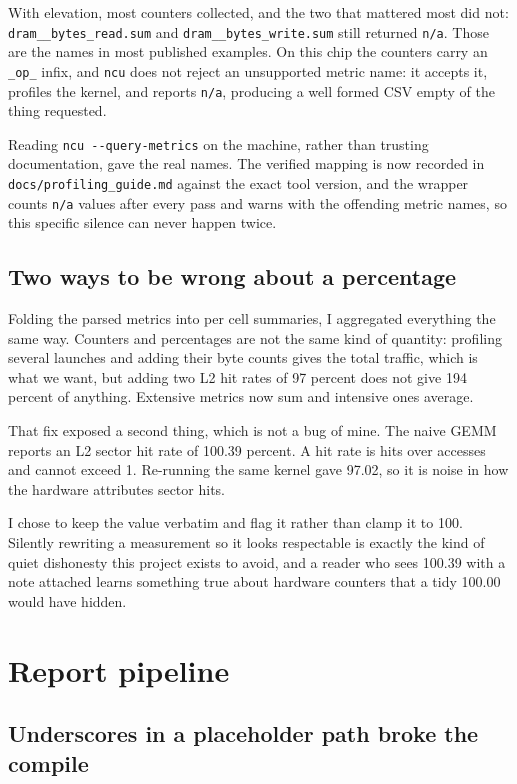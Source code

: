 ﻿\documentclass[11pt]{article}
\begin{document}
With elevation, most counters collected, and the two that mattered most did not:
\texttt{dram\_\_bytes\_\allowbreak read.sum} and
\texttt{dram\_\_bytes\_\allowbreak write.sum} still
returned \texttt{n/a}. Those are the names in most published examples. On this
chip the counters carry an \texttt{\_op\_} infix, and \texttt{ncu} does not reject
an unsupported metric name: it accepts it, profiles the kernel, and reports
\texttt{n/a}, producing a well formed CSV empty of the thing requested.

Reading \texttt{ncu -{}-query-metrics} on the machine, rather than trusting
documentation, gave the real names. The verified mapping is now recorded in
\texttt{docs/profiling\_guide.md} against the exact tool version, and the wrapper
counts \texttt{n/a} values after every pass and warns with the offending metric
names, so this specific silence can never happen twice.

\subsection{Two ways to be wrong about a percentage}

Folding the parsed metrics into per cell summaries, I aggregated everything the
same way. Counters and percentages are not the same kind of quantity: profiling
several launches and adding their byte counts gives the total traffic, which is
what we want, but adding two L2 hit rates of 97 percent does not give 194 percent
of anything. Extensive metrics now sum and intensive ones average.

That fix exposed a second thing, which is not a bug of mine. The naive GEMM
reports an L2 sector hit rate of 100.39 percent. A hit rate is hits over accesses
and cannot exceed 1. Re-running the same kernel gave 97.02, so it is noise in how
the hardware attributes sector hits.

I chose to keep the value verbatim and flag it rather than clamp it to 100.
Silently rewriting a measurement so it looks respectable is exactly the kind of
quiet dishonesty this project exists to avoid, and a reader who sees 100.39 with a
note attached learns something true about hardware counters that a tidy 100.00
would have hidden.

\section{Report pipeline}

\subsection{Underscores in a placeholder path broke the compile}
\end{document}
